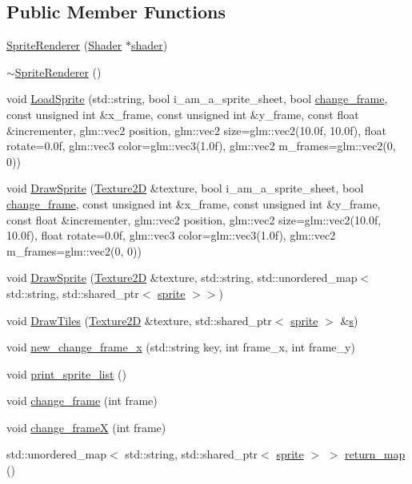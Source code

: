 \subsection*{Public Member Functions}
\begin{DoxyCompactItemize}
\item 
\hyperlink{classSpriteRenderer_a104f22e721b6d2d1b5e418880dda52a0}{Sprite\+Renderer} (\hyperlink{classShader}{Shader} $\ast$\hyperlink{classSpriteRenderer_a03aa49d90735e23e09f2e0b24da3bd5b}{shader})
\item 
\hyperlink{classSpriteRenderer_ae53730ef86000bf59905c2cf67e4d3a4}{$\sim$\+Sprite\+Renderer} ()
\item 
void \hyperlink{classSpriteRenderer_ab3e76fbe6cbb4ff8be6858cd843dee6c}{Load\+Sprite} (std\+::string, bool i\+\_\+am\+\_\+a\+\_\+sprite\+\_\+sheet, bool \hyperlink{classSpriteRenderer_addcfaa66a79d98c20449119bfc4f4cb2}{change\+\_\+frame}, const unsigned int \&x\+\_\+frame, const unsigned int \&y\+\_\+frame, const float \&incrementer, glm\+::vec2 position, glm\+::vec2 size=glm\+::vec2(10.\+0f, 10.\+0f), float rotate=0.\+0f, glm\+::vec3 color=glm\+::vec3(1.\+0f), glm\+::vec2 m\+\_\+frames=glm\+::vec2(0, 0))
\item 
void \hyperlink{classSpriteRenderer_aea1b4cf018526ae5c98eb66b446a2105}{Draw\+Sprite} (\hyperlink{classTexture2D}{Texture2D} \&texture, bool i\+\_\+am\+\_\+a\+\_\+sprite\+\_\+sheet, bool \hyperlink{classSpriteRenderer_addcfaa66a79d98c20449119bfc4f4cb2}{change\+\_\+frame}, const unsigned int \&x\+\_\+frame, const unsigned int \&y\+\_\+frame, const float \&incrementer, glm\+::vec2 position, glm\+::vec2 size=glm\+::vec2(10.\+0f, 10.\+0f), float rotate=0.\+0f, glm\+::vec3 color=glm\+::vec3(1.\+0f), glm\+::vec2 m\+\_\+frames=glm\+::vec2(0, 0))
\item 
void \hyperlink{classSpriteRenderer_aca1cf0c8ae37192f5d67662215eedf30}{Draw\+Sprite} (\hyperlink{classTexture2D}{Texture2D} \&texture, std\+::string, std\+::unordered\+\_\+map$<$ std\+::string, std\+::shared\+\_\+ptr$<$ \hyperlink{classsprite}{sprite} $>$$>$)
\item 
void \hyperlink{classSpriteRenderer_a0fa081d0a2c4cfdd042b423b12a9c10a}{Draw\+Tiles} (\hyperlink{classTexture2D}{Texture2D} \&texture, std\+::shared\+\_\+ptr$<$ \hyperlink{classsprite}{sprite} $>$ \&\hyperlink{classSpriteRenderer_a51d86fab88b20a802abd8e2333f920a7}{s})
\item 
void \hyperlink{classSpriteRenderer_aec4b432ac6c814cf7ccfe4ca775d7b1f}{new\+\_\+change\+\_\+frame\+\_\+x} (std\+::string key, int frame\+\_\+x, int frame\+\_\+y)
\item 
void \hyperlink{classSpriteRenderer_ae59ff1d27c7df21abb3154b2048d062b}{print\+\_\+sprite\+\_\+list} ()
\item 
void \hyperlink{classSpriteRenderer_addcfaa66a79d98c20449119bfc4f4cb2}{change\+\_\+frame} (int frame)
\item 
void \hyperlink{classSpriteRenderer_af17c77d882bb7140b3cde275fe270304}{change\+\_\+frameX} (int frame)
\item 
std\+::unordered\+\_\+map$<$ std\+::string, std\+::shared\+\_\+ptr$<$ \hyperlink{classsprite}{sprite} $>$ $>$ \hyperlink{classSpriteRenderer_a8c59dae5d92f767afcd55e83f8fb128c}{return\+\_\+map} ()
\end{DoxyCompactItemize}
